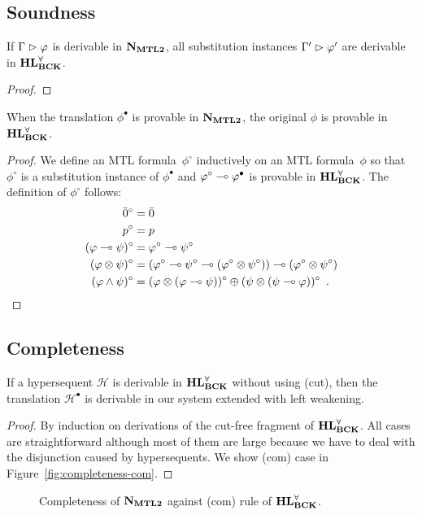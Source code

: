 \subsection{Soundness}

 \begin{proposition}\label{prop:sound-ind}
  If $\Gamma\vartriangleright\varphi$ is derivable in $\mathbf{N}_{\mathbf{MTL2}}$, all substitution instances
  $\Gamma'\vartriangleright\varphi'$ are derivable in $\mathbf{HL}^\forall_{\mathbf{BCK}}$.
 \end{proposition}
  \begin{proof}
  \end{proof}

 \begin{proposition}
  When the translation $\phi^\bullet$ is provable in $\mathbf{N}_{\mathbf{MTL2}}$, the
  original $\phi$ is provable in $\mathbf{HL}^\forall_{\mathbf{BCK}}$.
 \end{proposition}
  \begin{proof}
   We define an MTL formula~$\phi^\circ$ inductively on an MTL
   formula~$\phi$ so that $\phi^\circ$ is a substitution instance of
   $\phi^\bullet$ and $\varphi^\circ\multimap\varphi^\bullet$ is provable in
   $\mathbf{HL}^\forall_{\mathbf{BCK}}$.
   The definition of $\phi^\circ$ follows:
   \begin{align*}
    \bar 0^\circ&= \bar 0\\
    p^\circ &=p \\
    (\varphi\multimap\psi)^\circ&=\varphi^\circ\multimap\psi^\circ\\
    (\varphi\otimes\psi)^\circ &=
    (\varphi^\circ\multimap\psi^\circ\multimap(\varphi^\circ\otimes\psi^\circ))\multimap(\varphi^\circ\otimes\psi^\circ)\\
    (\varphi\land\psi)^\circ &=
    (\varphi\otimes(\varphi\multimap\psi))^\circ \oplus
    (\psi\otimes(\psi\multimap\varphi))^\circ\enspace.
   \end{align*}
  \end{proof}


\subsection{Completeness}

\begin{proposition}
 If a hypersequent $\mathcal H$ is
 derivable in $\mathbf{HL}^\forall_{\mathbf{BCK}}$ without using (cut), then the translation $\mathcal H^\bullet$ is
 derivable in our system extended with left weakening.
\end{proposition}
\begin{proof}
 By induction on derivations of the cut-free fragment of $\mathbf{HL}^\forall_{\mathbf{BCK}}$.
 All cases are straightforward although most of them are large because
 we have to deal with the disjunction caused by hypersequents.
 We show (com) case in Figure~\ref{fig:completeness-com}.
\end{proof}
 \begin{figure}
  \centering
  \caption{Completeness of $\mathbf{N}_{\mathbf{MTL2}}$ against (com) rule of $\mathbf{HL}^\forall_{\mathbf{BCK}}$.}
 \end{figure}

